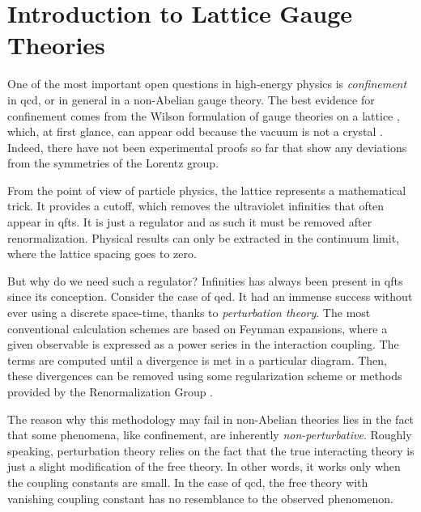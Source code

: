 \chapter{Introduction to Lattice Gauge Theories}
\label{chap:introduction_to_lattice_gauge_theories}

One of the most important open questions in high-energy physics is \emph{confinement} in \ac{qcd},
or in general in a non-Abelian gauge theory.
The best evidence for confinement comes from the Wilson formulation of gauge theories on a lattice \cite{wilson1974confinement}, which, at first glance, can appear odd because the vacuum is not a crystal \cite{creutz1985book}.
Indeed, there have not been experimental proofs so far that show any deviations from the symmetries of the Lorentz group.

From the point of view of particle physics, the lattice represents a mathematical trick.
It provides a cutoff, which removes the ultraviolet infinities that often appear in \acp{qft}.
It is just a regulator and as such it must be removed after renormalization.
Physical results can only be extracted in the continuum limit, where the lattice spacing goes to zero.

But why do we need such a regulator?
Infinities has always been present in \acp{qft} since its conception.
Consider the case of \ac{qed}.
It had an immense success without ever using a discrete space-time, thanks to \emph{perturbation theory}.
The most conventional calculation schemes are based on Feynman expansions,
where a given observable is expressed as a power series in the interaction coupling.
The terms are computed until a divergence is met in a particular diagram.
Then, these divergences can be removed using some regularization scheme or methods provided by the Renormalization Group \cite{peskin1995qft}.

The reason why this methodology may fail in non-Abelian theories lies in the fact that some phenomena, like confinement, are inherently \emph{non-perturbative}.
Roughly speaking, perturbation theory relies on the fact that the true interacting theory is just a slight modification of the free theory.
In other words, it works only when the coupling constants are small.
In the case of \ac{qcd}, the free theory with vanishing coupling constant has no resemblance to the observed phenomenon.

